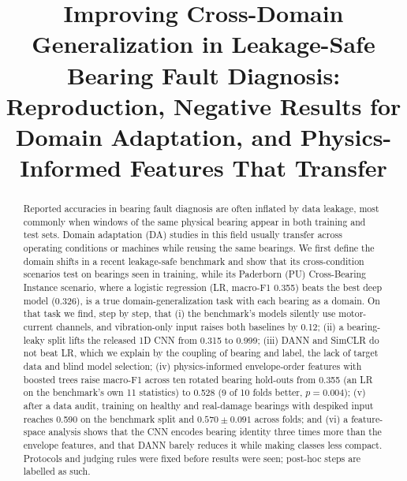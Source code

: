 \documentclass[conference]{IEEEtran}
\newcommand{\mF}{macro-F1}
\begin{document}
\title{Improving Cross-Domain Generalization in Leakage-Safe Bearing Fault Diagnosis:
Reproduction, Negative Results for Domain Adaptation, and Physics-Informed Features That Transfer}

\author{
}

\maketitle

\begin{abstract}
Reported accuracies in bearing fault diagnosis are often inflated by data leakage, most
commonly when windows of the same physical bearing appear in both training and test sets.
Domain adaptation (DA) studies in this field usually transfer across operating conditions or
machines while reusing the same bearings. We first define the domain shifts in a recent
leakage-safe benchmark and show that its cross-condition scenarios test on bearings seen in
training, while its Paderborn (PU) Cross-Bearing Instance scenario, where a logistic regression
(LR, \mF{} 0.355) beats the best deep model (0.326), is a true domain-generalization task with
each bearing as a domain. On that task we find, step by step, that (i) the benchmark's models
silently use motor-current channels, and vibration-only input raises both baselines by 0.12;
(ii) a bearing-leaky split lifts the released 1D CNN from 0.315 to 0.999; (iii) DANN and SimCLR do not
beat LR, which we explain by the coupling of bearing and label, the lack of target data and
blind model selection; (iv) physics-informed envelope-order features with boosted trees raise
\mF{} across ten rotated bearing hold-outs from 0.355 (an LR on the benchmark's own 11
statistics) to 0.528 (9 of 10 folds better, $p=0.004$);
(v) after a data audit, training on healthy and real-damage bearings with despiked input
reaches 0.590 on the benchmark split and $0.570\pm0.091$ across folds; and (vi) a feature-space
analysis shows that the CNN encodes bearing identity three times more than the envelope
features, and that DANN barely reduces it while making classes less compact. Protocols and judging
rules were fixed before results were seen; post-hoc steps are labelled as such.
\end{abstract}
\end{document}
